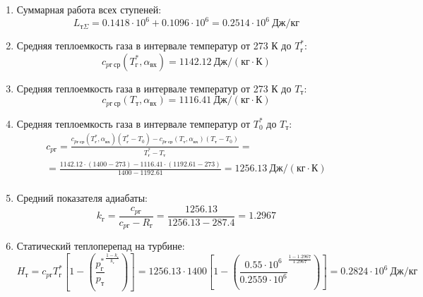 \documentclass[a4paper,10pt]{article}
\begin{document}
    
    \begin{enumerate}

        \item Суммарная работа всех ступеней:
        \[
            L_{т\Sigma} = 0.1418\cdot 10^6+0.1096\cdot 10^6 = 0.2514 \cdot 10^6 \ Дж/кг
        \]

        \item Средняя теплоемкость газа в интервале температур от 273 К до $T_г^*$:
        \[
            c_{pг\ ср} (T_г^*, \alpha_{вх}) =
            1142.12 \ Дж/(кг \cdot К)
        \]

        \item Средняя теплоемкость газа в интервале температур от 273 К до $T_т$:
        \[
            c_{pг\ ср} (T_т, \alpha_{вх}) =
            1116.41 \ Дж/(кг \cdot К)
        \]

        \item Средняя теплоемкость газа в интервале температур от $T_0^*$ до $T_т$:
        \begin{gather*}
            c_{pг} = \frac{
		         c_{pг\ ср} (T_г^*, \alpha_{вх}) (T_г^* - T_0) - c_{pг\ ср} (T_{т}, \alpha_{вх})(T_т - T_0)
		    }{
		        T_г^* - T_т} =\\
            =\frac{
                1142.12 \cdot
                (1400 - 273) -
		        1116.41 \cdot
                (1192.61 - 273)
		    }{
		        1400 - 1192.61} =
		    1256.13 \ Дж / (кг \cdot К)\\
        \end{gather*}

        \item Средний показателя адиабаты:
        \[
            k_г = \frac{c_{pг}}{c_{pг} - R_г} =
                \frac{
                    1256.13
                }{
                    1256.13 - 287.4
                }
            = 1.2967
        \]

        \item Статический теплоперепад на турбине:
        \[
            H_т = c_{pг} T_г^* \left[
                        1 - \left(
                                \frac{p_г^*}{p_т} ^
                                \frac{1 - k_г}{k_г}
                    \right)
                \right] =
            1256.13 \cdot 1400
                \left[
                    1 - \left(
                            \frac{
                                0.55 \cdot 10^6
                            }{
                                0.2559 \cdot 10^6 } ^
                            \frac{ 1 - 1.2967 }{ 1.2967 }
                    \right)
            \right] =
            0.2824 \cdot 10^6 \ Дж/кг
        \]


\end{enumerate}
\end{document}
